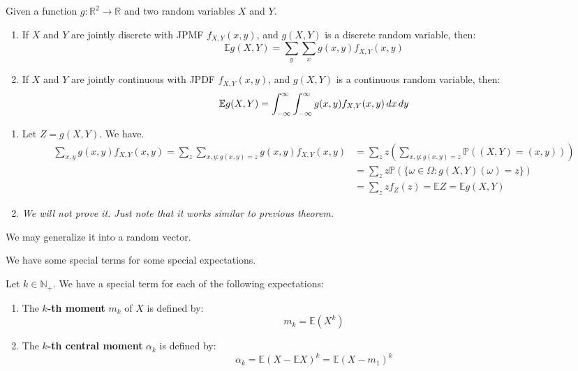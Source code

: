 \documentclass{huhtakm-template-book}
\newcommand{\prob}{\mathbb{P}}
\newcommand{\expect}{\mathbb{E}}
\begin{document}
\newpage
\begin{thm}
	Given a function $g:\mathbb{R}^{2}\to\mathbb{R}$ and two random variables $X$ and $Y$.
	\begin{enumerate}
		\item If $X$ and $Y$ are jointly discrete with JPMF $f_{X,Y}(x,y)$, and $g(X,Y)$ is a discrete random variable, then:
		\begin{equation*}
			\expect{g(X,Y)}=\sum_{y}\sum_{x}g(x,y)f_{X,Y}(x,y)
		\end{equation*}
		\item If $X$ and $Y$ are jointly continuous with JPDF $f_{X,Y}(x,y)$, and $g(X,Y)$ is a continuous random variable, then:
		\begin{equation*}
			\expect{g(X,Y)}=\intinfty\intinfty g(x,y)f_{X,Y}(x,y)\,dx\,dy
		\end{equation*}
	\end{enumerate} 
\end{thm}
\begin{proofing}
	\begin{enumerate}
		\item Let $Z=g(X,Y)$. We have.
		\begin{align*}
			\sum_{x,y}g(x,y)f_{X,Y}(x,y)=\sum_{z}\sum_{x,y:g(x,y)=z}g(x,y)f_{X,Y}(x,y)&=\sum_{z}z\left(\sum_{x,y:g(x,y)=z}\prob((X,Y)=(x,y))\right)\\
			&=\sum_{z}z\prob(\{\omega\in\Omega:g(X,Y)(\omega)=z\})\\
			&=\sum_{z}zf_{Z}(z)=\expect Z=\expect g(X,Y)
		\end{align*}
		\item \textit{We will not prove it. Just note that it works similar to previous theorem.}
	\end{enumerate}
\end{proofing}
\begin{rem}
	We may generalize it into a random vector. 
\end{rem}
We have some special terms for some special expectations.
\begin{defn}
	Let $k\in\mathbb{N}_{+}$. We have a special term for each of the following expectations:
	\begin{enumerate}
		\item The \textbf{$k$-th moment} $m_{k}$ of $X$ is defined by:
		\begin{equation*}
			m_{k}=\expect(X^{k})
		\end{equation*}
		\item The \textbf{$k$-th central moment} $\alpha_{k}$ is defined by:
		\begin{equation*}
			\alpha_{k}=\expect(X-\expect X)^{k}=\expect(X-m_{1})^{k}
		\end{equation*}
	\end{enumerate}
\end{defn}
\end{document}
